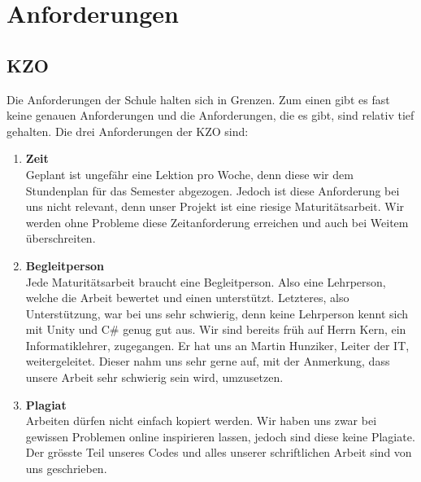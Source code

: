 \chapter{Anforderungen}

\section{KZO}
Die Anforderungen der Schule halten sich in Grenzen. Zum einen gibt es fast keine
genauen Anforderungen und die Anforderungen, die es gibt, sind relativ tief gehalten. Die drei Anforderungen der KZO sind:
\begin{enumerate}
    \item \textbf{Zeit} \\
        Geplant ist ungefähr eine Lektion pro Woche, denn diese wir dem Stundenplan für das Semester abgezogen.
        Jedoch ist diese Anforderung bei uns nicht relevant, denn unser Projekt ist eine riesige Maturitätsarbeit.
        Wir werden ohne Probleme diese Zeitanforderung erreichen und auch bei Weitem überschreiten.
    \item \textbf{Begleitperson} \\
        Jede Maturitätsarbeit braucht eine Begleitperson. Also eine Lehrperson, welche die Arbeit bewertet und einen unterstützt.
        Letzteres, also Unterstützung, war bei uns sehr schwierig, denn keine Lehrperson kennt sich mit Unity und C\# genug gut aus.
        Wir sind bereits früh auf Herrn Kern, ein Informatiklehrer, zugegangen.
        Er hat uns an Martin Hunziker, Leiter der IT, weitergeleitet. Dieser nahm uns sehr gerne auf, mit der Anmerkung, dass unsere Arbeit sehr schwierig sein wird, umzusetzen.
    \item \textbf{Plagiat} \\
        Arbeiten dürfen nicht einfach kopiert werden. Wir haben uns zwar bei gewissen Problemen online inspirieren lassen, jedoch sind diese keine Plagiate.
        Der grösste Teil unseres Codes und alles unserer schriftlichen Arbeit sind von uns geschrieben.
\end{enumerate}

